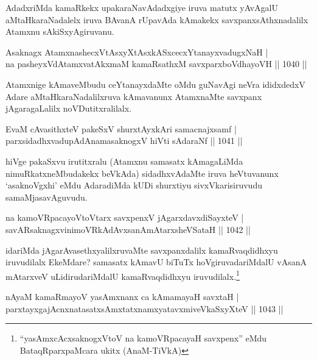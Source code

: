 \begin{artha}
AdadxriMda kamaRkekx upakaraNavAdadxgiye iruva matutx yAvAgalU aMtaHkaraNadalelx iruva BAvanA rUpavAda kAmakekx savxpanxsAthxnadalilx Atamxnu sAkiSxyAgiruvanu.
\end{artha}

\begin{shl}
Asaknagx AtamxnashecxVtAsxyXtAsxkASxcecxYtanayxvadugxNaH | \\
na pasheyxVdAtamxvatAkxmaM kamaRsathxM savxparxboVdhayoVH \hfill||  1040 ||  
\end{shl}

\begin{artha}
Atamxnige kAmaveMbudu ceYtanayxdaMte oMdu guNavAgi neVra ididxdedxV Adare aMtaHkaraNadalilxruva kAmavanunx AtamxnaMte savxpanx jAgaragaLalilx noVDutitxralilalx.
\end{artha}

\begin{shl}
EvaM cAvasithxteV pakeSxV shurxtAyx\s kAri samacnajxsamf | \\
parxsidadhxvadupAdAnamasaknogxV hiVti sAdaraNf \hfill||  1041 ||  
\end{shl}

\begin{artha}
hiVge pakaSxvu irutitxralu (Atamxnu samasatx kAmagaLiMda nimuRkatxneMbudakekx beVkAda) sidadhxvAdaMte iruva heVtuvanunx `asaknoVgxhi' eMdu AdaradiMda kUDi shurxtiyu sivxVkarisiruvudu samaMjasavAguvudu.
\end{artha}

\begin{shl}
na kamoVRpacayoV\s toV\s tarx savxpenxV jAgarxdavxdiSayxteV | \\
savARsaknagxvinimoVRkAdAvxsanAmAtarxsheVSataH \hfill||  1042 ||  
\end{shl}

\begin{artha}
idariMda jAgarAvasethxyalilxruvaMte savxpanxdalilx kamaRvaqdidhxyu iruvudilalx EkeMdare? samasatx kAmavU biTuTx hoVgiruvadariMdalU vAsanA mAtarxveV uLidirudariMdalU kamaRvaqdidhxyu iruvudilalx.\footnote{``yasAmxcAcxsaknogxV\s toV na kamoVRpacayaH savxpenx'' eMdu BataqRparxpaMcara ukitx (AnaM-TiVkA)}
\end{artha}


\begin{shl}
nAyaM kamaRmayoV yasAmxnanx ca kAmamayaH savxtaH | \\
parxtayxgajAcnxnatasatxsAmxtatxnamxyatavxmiveVkaSxyXteV \hfill||  1043 ||  
\end{shl}

